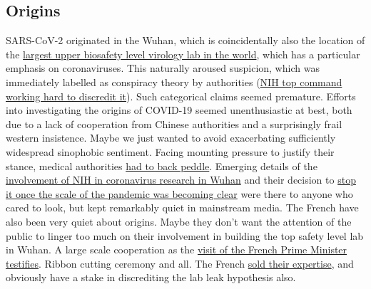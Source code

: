 \documentclass[11pt,a4paper,notitlepage]{report}
\begin{document}
\subsection*{Origins}

SARS-CoV-2 originated in the Wuhan, which is coincidentally also the location of the \href{https://theconversation.com/fifty-nine-labs-around-world-handle-the-deadliest-pathogens-only-a-quarter-score-high-on-safety-161777}{largest upper biosafety level virology lab in the world}, which has a particular emphasis on coronaviruses. This naturally aroused suspicion, which was immediately labelled as conspiracy theory by authorities (\href{https://nypost.com/2022/01/11/fauci-called-wuhan-lab-leak-theory-shiny-object-in-april-2020-email/}{NIH top command working hard to discredit it}). Such categorical claims seemed premature. Efforts into investigating the origins of COVID-19 seemed unenthusiastic at best, both due to a lack of cooperation from Chinese authorities and a surprisingly frail western insistence. Maybe we just wanted to avoid exacerbating sufficiently widespread sinophobic sentiment. Facing mounting pressure to justify their stance, medical authorities \href{https://www.theguardian.com/world/2021/jul/16/who-chief-says-push-to-discount-lab-leak-theory-was-premature}{had to back peddle}. Emerging details of the \href{https://www.vanityfair.com/news/2021/10/nih-admits-funding-risky-virus-research-in-wuhan}{involvement of NIH in coronavirus research in Wuhan} and their decision to \href{https://www.the-scientist.com/news-opinion/nih-cancels-funding-for-bat-coronavirus-research-project-67486}{stop it once the scale of the pandemic was becoming clear} were there to anyone who cared to look, but kept remarkably quiet in mainstream media. The French have also been very quiet about origins. Maybe they don't want the attention of the public to linger too much on their involvement in building the top safety level lab in Wuhan. A large scale cooperation as the \href{http://english.whiov.cas.cn/ne/201802/t20180208_189991.html}{visit of the French Prime Minister testifies}. Ribbon cutting ceremony and all. The French \href{https://www.challenges.fr/entreprise/sante-et-pharmacie/revelations-l-histoire-secrete-du-laboratoire-p4-de-wuhan-vendu-par-la-france-a-la-chine_707425}{sold their expertise}, and obviously have a stake in discrediting the lab leak hypothesis also. 
\end{document}
